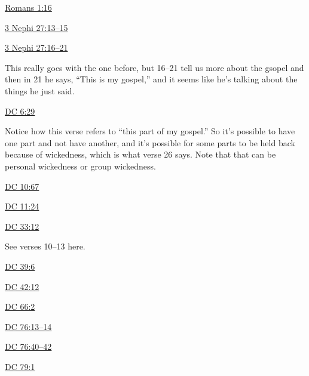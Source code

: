 		\begin{compactdesc}
			\item[{\hyperref[ROMANS-1-16]{Romans 1:16}}]
			\item[{\hyperref[3NEPHI-27-13]{3 Nephi 27:13--15}}]
			\item[{\hyperref[3NEPHI-27-16]{3 Nephi 27:16--21}}] \phantom{.}
				\begin{compactitem}
					\item This really goes with the one before, but 16--21 tell us more about the gsopel and then in 21 he says, ``This is my gospel,'' and it seems like he's talking about the things he just said.
				\end{compactitem}
			\item[{\hyperref[DC6-29]{DC 6:29}}] \phantom{.}
				\begin{compactitem}
					\item Notice how this verse refers to ``this part of my gospel.'' So it's possible to have one part and not have another, and it's possible for some parts to be held back because of wickedness, which is what verse 26 says. Note that that can be personal wickedness or group wickedness.
				\end{compactitem}
			\item[{\hyperref[DC10-67]{DC 10:67}}] 
			\item[{\hyperref[DC11-24]{DC 11:24}}]
			\item[{\hyperref[DC33-12]{DC 33:12}}] \phantom{.}
				\begin{compactitem}
					\item See verses 10--13 here.
				\end{compactitem}
			\item[{\hyperref[DC39-6]{DC 39:6}}] 
			\item[{\hyperref[DC42-12]{DC 42:12}}] 
			\item[{\hyperref[DC66-2]{DC 66:2}}]
			\item[{\hyperref[DC76-13]{DC 76:13--14}}]
			\item[{\hyperref[DC76-40]{DC 76:40--42}}]
			\item[{\hyperref[DC79-1]{DC 79:1}}]
		\end{compactdesc} 